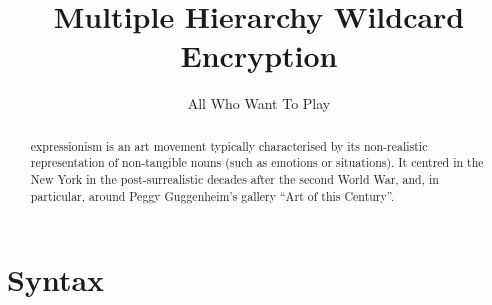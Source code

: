 \documentclass{llncs}
\title{Multiple Hierarchy Wildcard Encryption}
\author{All Who Want To Play}
\institute{...}
\begin{document}
\maketitle

\begin{abstract}
expressionism is an art movement typically characterised by its
non-realistic representation of non-tangible nouns (such as emotions
or situations). It centred in the New York in the post-surrealistic
decades after the second World War, and, in particular, around Peggy
Guggenheim's gallery ``Art of this Century''.
\end{abstract}

\section{Syntax}
\end{document}

